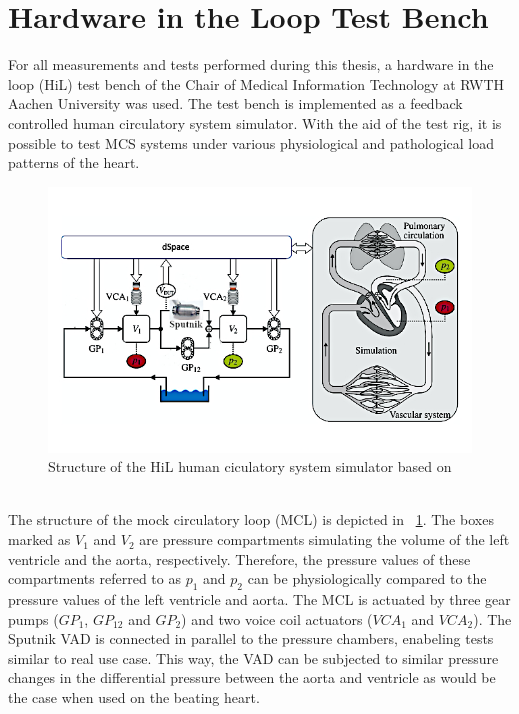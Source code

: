 \section{Hardware in the Loop Test Bench}
For all measurements and tests performed during this thesis, a hardware in the loop (HiL) test bench of the Chair of Medical Information Technology at RWTH Aachen University was used. The test bench is implemented as a feedback controlled human circulatory system simulator. With the aid of the test rig, it is possible to test MCS systems under various physiological and pathological load patterns of the heart.
\begin{figure}[h]
  \centering
  \includegraphics[width=\textwidth]{images/mock_loop.jpg}
  \caption[HiL test bench \cite{Sputnik6}]{Structure of the HiL human ciculatory system simulator based on \cite{MCL}}
  \label{fig:mock_loop}
\end{figure}
\\The structure of the mock circulatory loop (MCL) is depicted in \figurename~\ref{fig:mock_loop}. The boxes marked as $V_{1}$ and $V_{2}$ are pressure compartments simulating the volume of the left ventricle and the aorta, respectively. Therefore, the pressure values of these compartments referred to as $p_{1}$ and $p_{2}$ can be physiologically compared to the pressure values of the left ventricle and aorta. The MCL is actuated by three gear pumps ($GP_{1}$, $GP_{12}$ and $GP_{2}$) and two voice coil actuators ($VCA_{1}$ and $VCA_{2}$). The Sputnik VAD is connected in parallel to the pressure chambers, enabeling tests similar to real use case. This way, the VAD can be subjected to similar pressure changes in the differential pressure between the aorta and ventricle as would be the case when used on the beating heart.
